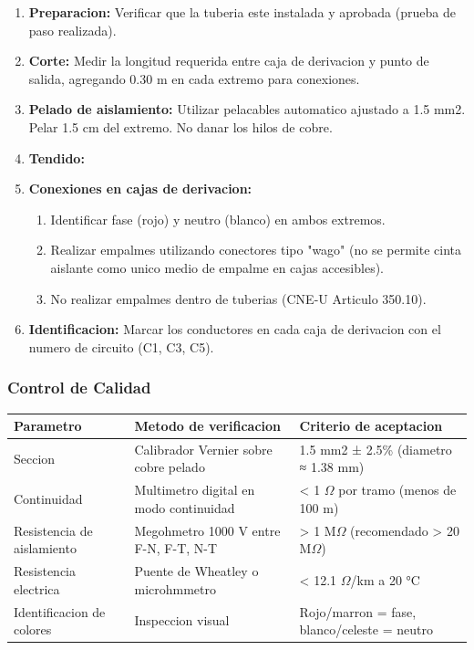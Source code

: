 \begin{enumerate}
  \item \textbf{Preparacion:} Verificar que la tuberia este instalada y aprobada (prueba de paso realizada).
  \item \textbf{Corte:} Medir la longitud requerida entre caja de derivacion y punto de salida, agregando 0.30 m en cada extremo para conexiones.
  \item \textbf{Pelado de aislamiento:} Utilizar pelacables automatico ajustado a 1.5 mm2. Pelar 1.5 cm del extremo. No danar los hilos de cobre.
  \item \textbf{Tendido:}
  \item \textbf{Conexiones en cajas de derivacion:}
  \begin{enumerate}
    \item Identificar fase (rojo) y neutro (blanco) en ambos extremos.
    \item Realizar empalmes utilizando conectores tipo "wago" (no se permite cinta aislante como unico medio de empalme en cajas accesibles).
    \item No realizar empalmes dentro de tuberias (CNE-U Articulo 350.10).
  \end{enumerate}
  \item \textbf{Identificacion:} Marcar los conductores en cada caja de derivacion con el numero de circuito (C1, C3, C5).
\end{enumerate}

\subsubsection{Control de Calidad}

\begin{longtable}{L{4.5cm} L{4.5cm} L{4.5cm}}
\toprule
\textbf{Parametro} & \textbf{Metodo de verificacion} & \textbf{Criterio de aceptacion} \\
\midrule
Seccion & Calibrador Vernier sobre cobre pelado & 1.5 mm2 ± 2.5\% (diametro ≈ 1.38 mm) \\
Continuidad & Multimetro digital en modo continuidad & < 1 $\Omega$ por tramo (menos de 100 m) \\
Resistencia de aislamiento & Megohmetro 1000 V entre F-N, F-T, N-T & > 1 M$\Omega$ (recomendado > 20 M$\Omega$) \\
Resistencia electrica & Puente de Wheatley o microhmmetro & < 12.1 $\Omega$/km a 20 °C \\
Identificacion de colores & Inspeccion visual & Rojo/marron = fase, blanco/celeste = neutro \\
\bottomrule
\end{longtable}

